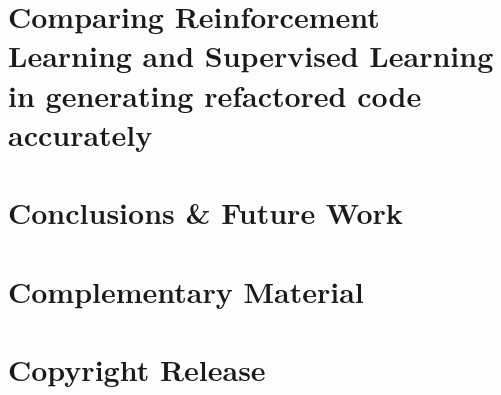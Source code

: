 \documentclass[12pt, glossary]{dalthesis}
\begin{document}
\chapter{Comparing Reinforcement Learning and Supervised Learning in generating refactored code accurately}


\chapter{Conclusions \& Future Work}





\appendix

\chapter{Complementary Material}


\chapter{Copyright Release}

\end{document}
